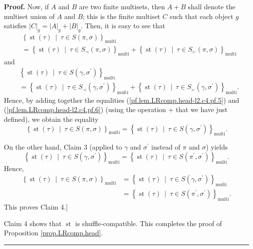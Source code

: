 \documentclass[numbers=enddot,12pt,final,onecolumn,notitlepage]{scrartcl}%
\theoremstyle{definition}
\newenvironment{proof}[1][Proof]{\noindent\textbf{#1.} }{\ \rule{0.5em}{0.5em}}
\newenvironment{verlong}{}{}
\begin{document}
\begin{verlong}
\begin{proof}
Now, if $A$ and $B$ are two finite multisets, then $A+B$ shall denote the
multiset union of $A$ and $B$; this is the finite multiset $C$ such that
each object
$g$ satisfies $\left\vert C\right\vert _{g}=\left\vert A\right\vert
_{g}+\left\vert B\right\vert _{g}$. Then, it is easy to see that%
\begin{align*}
&  \left\{  \operatorname*{st}\left(  \tau\right)  \ \mid\ \tau\in S\left(
\pi,\sigma\right)  \right\}  _{\operatorname*{multi}}\\
&  =\left\{  \operatorname*{st}\left(  \tau\right)  \ \mid\ \tau\in S_{\prec
}\left(  \pi,\sigma\right)  \right\}  _{\operatorname*{multi}}+\left\{
\operatorname*{st}\left(  \tau\right)  \ \mid\ \tau\in S_{\succ}\left(
\pi,\sigma\right)  \right\}  _{\operatorname*{multi}}%
\end{align*}
and
\begin{align*}
&  \left\{  \operatorname*{st}\left(  \tau\right)  \ \mid\ \tau\in S\left(
\gamma,\sigma^{\prime}\right)  \right\}  _{\operatorname*{multi}}\\
&  =\left\{  \operatorname*{st}\left(  \tau\right)  \ \mid\ \tau\in S_{\prec
}\left(  \gamma,\sigma^{\prime}\right)  \right\}  _{\operatorname*{multi}%
}+\left\{  \operatorname*{st}\left(  \tau\right)  \ \mid\ \tau\in S_{\succ
}\left(  \gamma,\sigma^{\prime}\right)  \right\}  _{\operatorname*{multi}}.
\end{align*}
Hence, by adding together the equalities (\ref{pf.lem.LRcomp.head-l2.c4.pf.5})
and (\ref{pf.lem.LRcomp.head-l2.c4.pf.6}) (using the operation $+$ that we
have just defined), we obtain the equality%
\[
\left\{  \operatorname*{st}\left(  \tau\right)  \ \mid\ \tau\in S\left(
\pi,\sigma\right)  \right\}  _{\operatorname*{multi}}=\left\{
\operatorname*{st}\left(  \tau\right)  \ \mid\ \tau\in S\left(  \gamma
,\sigma^{\prime}\right)  \right\}  _{\operatorname*{multi}}.
\]


On the other hand, Claim 3 (applied to $\gamma$ and $\sigma^{\prime}$ instead
of $\pi$ and $\sigma$) yields%
\[
\left\{  \operatorname*{st}\left(  \tau\right)  \ \mid\ \tau\in S\left(
\gamma,\sigma^{\prime}\right)  \right\}  _{\operatorname*{multi}}=\left\{
\operatorname*{st}\left(  \tau\right)  \ \mid\ \tau\in S\left(  \pi^{\prime
},\sigma^{\prime}\right)  \right\}  _{\operatorname*{multi}}.
\]
Hence,%
\begin{align*}
\left\{  \operatorname*{st}\left(  \tau\right)  \ \mid\ \tau\in S\left(
\pi,\sigma\right)  \right\}  _{\operatorname*{multi}}  &  =\left\{
\operatorname*{st}\left(  \tau\right)  \ \mid\ \tau\in S\left(  \gamma
,\sigma^{\prime}\right)  \right\}  _{\operatorname*{multi}}\\
&  =\left\{  \operatorname*{st}\left(  \tau\right)  \ \mid\ \tau\in S\left(
\pi^{\prime},\sigma^{\prime}\right)  \right\}  _{\operatorname*{multi}}.
\end{align*}
This proves Claim 4.]

Claim 4 shows that $\operatorname*{st}$ is shuffle-compatible. This completes
the proof of Proposition \ref{prop.LRcomp.head}.
\end{proof}
\end{verlong}
\end{document}
